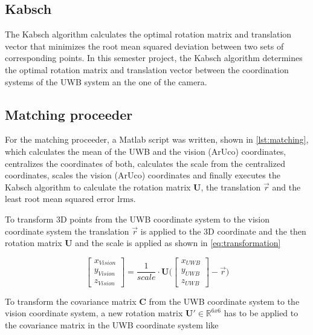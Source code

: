 \subsection{Kabsch}
The Kabsch algorithm \cite{Kabsch:a12999} calculates the optimal rotation matrix and translation vector that minimizes the root mean squared deviation between two sets of corresponding points. In this semester project, the Kabsch algorithm determines the optimal rotation matrix and translation vector between the coordination systems of the \ac{UWB} system an the one of the camera.

\subsection{Matching proceeder}\label{subsec:matching}
For the matching proceeder, a Matlab script was written, shown in \autoref{lst:matching}, which calculates the mean of the \ac{UWB} and the vision (ArUco) coordinates, centralizes the coordinates of both, calculates the scale from the centralized coordinates, scales the vision (ArUco) coordinates and finally executes the Kabsch algorithm to calculate the rotation matrix $\textbf{U}$, the translation $\vec r$ and the least root mean squared error $\text{lrms}$.

To transform 3D points from the \ac{UWB} coordinate system to the vision coordinate system the translation $\vec r$ is applied to the 3D coordinate and the then rotation matrix $\textbf{U}$ and the scale is applied as shown in \autoref{eq:transformation}

\begin{equation}\label{eq:transformation}
	\begin{bmatrix}
		x_{\textit{Vision}} \\
		y_{\textit{Vision}} \\
		z_{\textit{Vision}}
	\end{bmatrix} = \frac{1}{\mathit{scale}} \cdot \textbf{U}
	\Bigg( \begin{bmatrix}
		x_{\textit{UWB}} \\
		y_{\textit{UWB}} \\
		z_{\textit{UWB}}
	\end{bmatrix} - \vec r \Bigg)
\end{equation}

To transform the covariance matrix $\textbf{C}$ from the \ac{UWB} coordinate system to the vision coordinate system, a new rotation matrix $\textbf{U}' \in \mathbb{R}^{6x6}$ has to be applied to the covariance matrix in the \ac{UWB} coordinate system like


